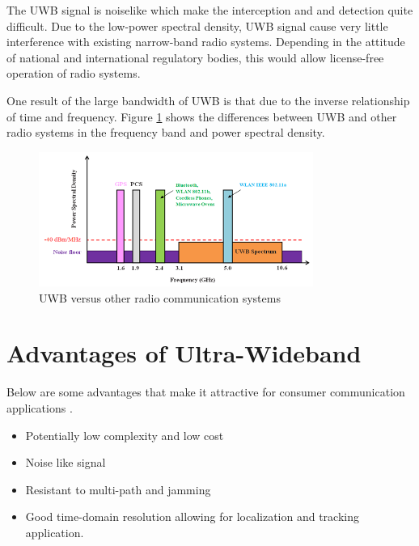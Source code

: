 \documentclass[\main/main.tex]{subfiles}
\begin{document}
The UWB signal is noiselike which make the interception and and detection quite difficult. Due to the low-power spectral density, UWB signal cause very little interference with existing narrow-band radio systems. Depending in the attitude of national and international regulatory bodies, this would allow license-free operation of radio systems.

One result of the large bandwidth of UWB is that due to the inverse relationship of
time and frequency. Figure \ref{fig:uwb_versus_other_radio_communication_systems} shows the differences between UWB and other radio systems in the frequency band and power spectral density.

\begin{figure}[H]
    \centering
    \includegraphics[width=0.8\textwidth]{uwb_versus_other_radio_communication_systems.png}
    \caption{UWB versus other radio communication systems}
    \label{fig:uwb_versus_other_radio_communication_systems}
\end{figure}

\section{Advantages of Ultra-Wideband}

Below are some advantages that make it attractive for consumer communication applications \cite{uwb_theory_and_applications}.
\begin{itemize}
    \item Potentially low complexity and low cost
    \item Noise like signal
    \item Resistant to multi-path and jamming
    \item Good time-domain resolution allowing for localization and tracking application.
\end{itemize}
\end{document}

